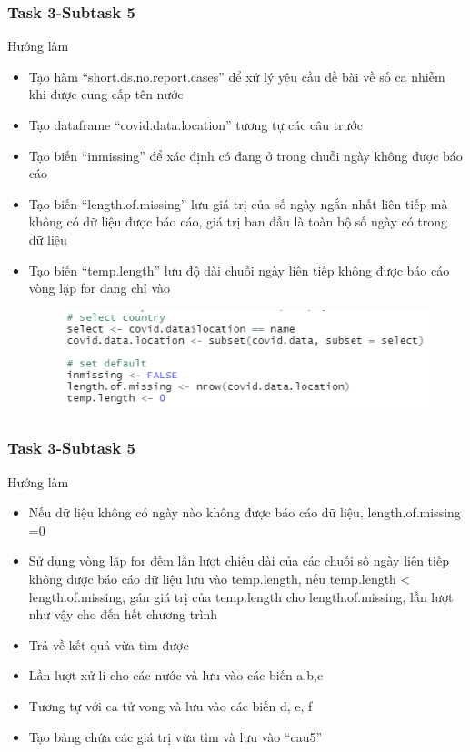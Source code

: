\documentclass[english,10pt,table]{beamer}
\begin{document}
{
    \frametitle{Task 3-Subtask 5}
    \begin{block}{Hướng làm}
         \begin{itemize}
	\item Tạo hàm “short.ds.no.report.cases” để xử lý yêu cầu đề bài về số ca nhiễm khi được cung cấp tên nước
	\item Tạo dataframe “covid.data.location” tương tự các câu trước
	\item Tạo biến “inmissing” để xác định có đang ở trong chuỗi ngày không được báo cáo
	\item Tạo biến “length.of.missing” lưu giá trị của số ngày ngắn nhất liên tiếp mà không có dữ liệu được báo cáo, giá trị ban đầu là toàn bộ số ngày có trong dữ liệu
	\item Tạo biến “temp.length” lưu độ dài chuỗi ngày liên tiếp không được báo cáo vòng lặp for đang chỉ vào
	            \begin{figure}[H]
			    	\centering
			    	\includegraphics[scale=0.6]{images/3.0.5.png}
		    	\end{figure}
			    \end{itemize}
    \end{block}
}
\frame
{
    \frametitle{Task 3-Subtask 5}
    \begin{block}{Hướng làm}
         \begin{itemize}
	\item Nếu dữ liệu không có ngày nào không được báo cáo dữ liệu, length.of.missing =0
	\item Sử dụng vòng lặp for đếm lần lượt chiều dài của các chuỗi số ngày liên tiếp không được báo cáo dữ liệu lưu vào temp.length, nếu temp.length < length.of.missing, gán giá trị của temp.length cho length.of.missing, lần lượt như vậy cho đến hết chương trình
	\item Trả về kết quả vừa tìm được
	\item Lần lượt xử lí cho các nước và lưu vào các biến a,b,c
	\item Tương tự với ca tử vong và lưu vào các biến d, e, f
	\item Tạo bảng chứa các giá trị vừa tìm và lưu vào “cau5”
			    \end{itemize}
    \end{block}
}
\end{document}
